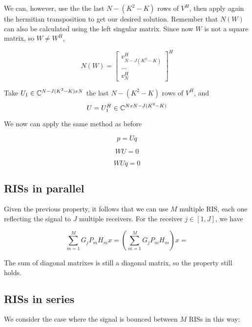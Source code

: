 We can, however, use the the last $N - (K^2 - K)$ rows of $V^H$, then apply again the hermitian transposition to get our desired solution. Remember that $N(W)$ can also be calculated using the left singular matrix. Since now $W$ is not a square matrix, so $W \ne W^H$,

\begin{equation}
  N(W) = \begin{bmatrix} v^H_{N - J(K^2 - K)} \\ ... \\ v^H_N \end{bmatrix} ^ H
\end{equation}

Take $U_1 \in \mathbb{C} ^ {N - J(K^2 - K) x N}$ the last $N - (K^2 - K)$ rows of $V^H$, and
\begin{equation}
  U = U_1^H \in \mathbb{C} ^ {N x N - J(K^2 - K)}
\end{equation}

We now can apply the same method as before

\begin{equation}p = Uq\end{equation}

\begin{equation}WU = 0\end{equation}

\begin{equation}WUq = 0\end{equation}

\subsection{RISs in parallel}

Given the previous property, it follows that we can use $M$ multiple RIS, each one reflecting the signal to $J$ multiple receivers. For the receiver $j \in [1, J]$, we have

\begin{equation}
  \sum_{m=1}^M G_j P_m H_m x = (\sum_{m=1}^M G_j P_m H_m) x =
\end{equation}

The sum of diagonal matrixes is still a diagonal matrix, so the property still holds.

\subsection{RISs in series}

We consider the case where the signal is bounced between $M$ RISs in this way:

